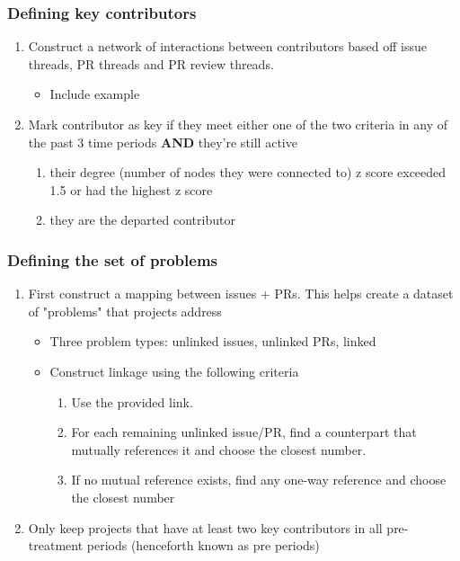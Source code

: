 \documentclass[12pt,notitlepage]{article}
\begin{document}
\subsubsection{Defining key contributors}
\begin{enumerate}
    \item Construct a network of interactions between contributors based off issue threads, PR threads and PR review threads.
    \begin{itemize}
        \item Include example
    \end{itemize}
    \item Mark contributor as key if they meet either one of the two criteria in any of the past 3 time periods \textbf{AND} they're still active
    \begin{enumerate}
        \item their degree (number of nodes they were connected to) z score exceeded 1.5 or had the highest z score 
        \item they are the departed contributor
    \end{enumerate} 
\end{enumerate}
\subsubsection{Defining the set of problems}
\begin{enumerate}
    \item First construct a mapping between issues + PRs. This helps create a dataset of "problems" that projects address
    \begin{itemize}
        \item Three problem types: unlinked issues, unlinked PRs, linked
        \item Construct linkage using the following criteria
        \begin{enumerate}
          \item Use the provided link.
          \item For each remaining unlinked issue/PR, find a counterpart that mutually references it and choose the closest number.
          \item If no mutual reference exists, find any one-way reference and choose the closest number
        \end{enumerate}
    \end{itemize}
    \item Only keep projects that have at least two key contributors in all pre-treatment periods (henceforth known as pre periods)
\end{enumerate}
\end{document}
